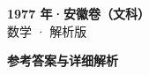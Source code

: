 \documentclass[zihao=-4, a4paper]{ctexart}
\begin{document}
\begin{center}
  {\Large\bfseries 1977 年·安徽卷（文科）}\\[4pt]
  {\large 数学 · 解析版}
\end{center}
\medskip
{}

\clearpage
{}
\begin{center}{\Large\bfseries 参考答案与详细解析}\end{center}
\medskip

\end{document}
